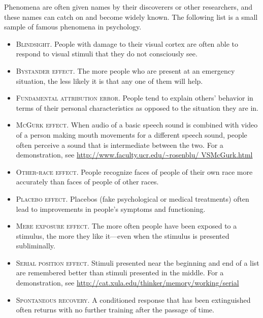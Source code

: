  Phenomena are often given names by their discoverers or other researchers, and these names can catch on and become widely known. The following list is a small sample of famous phenomena in psychology.
 \begin{itemize}
 \item \textsc{Blindsight}. People with damage to their visual cortex are often able to respond to visual stimuli that they do not consciously see.
 \item \textsc{Bystander effect}. The more people who are present at an emergency situation, the less likely it is that any one of them will help.
 \item \textsc{Fundamental attribution error}. People tend to explain others' behavior in terms of their personal characteristics as opposed to the situation they are in.
 \item \textsc{McGurk effect}. When audio of a basic speech sound is combined with video of a person making mouth movements for a different speech sound, people often perceive a sound that is intermediate between the two. For a demonstration, see \url{http://www.faculty.ucr.edu/~rosenblu/ VSMcGurk.html}
 \item \textsc{Other-race effect}. People recognize faces of people of their own race more accurately than faces of people of other races.
 \item \textsc{Placebo effect}. Placebos (fake psychological or medical treatments) often lead to improvements in people's symptoms and functioning.

 \item \textsc{Mere exposure effect}. The more often people have been exposed to a stimulus, the more they like it---even when the stimulus is presented subliminally.
 \item \textsc{Serial position effect}. Stimuli presented near the beginning and end of a list are remembered better than stimuli presented in the middle. For a demonstration, see \url{http://cat.xula.edu/thinker/memory/working/serial}
 \item \textsc{Spontaneous recovery}. A conditioned response that has been extinguished often returns with no further training after the passage of time.
 \end{itemize}

